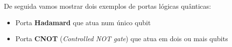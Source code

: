 \documentclass{report}
\begin{document}
	De seguida vamos mostrar dois exemplos de portas lógicas quânticas:

\begin{itemize}
  \item Porta \textbf{Hadamard} que atua num único qubit
  
  \begin{figure}[!h]
	\centering
	\qquad
\end{figure}
  
  
  \item Porta \textbf{CNOT}	(\textit{Controlled NOT gate}) que atua em dois ou mais qubits
  
   \begin{figure}[!h]
	\centering
	\qquad
\end{figure}
\end{itemize}
\end{document}
